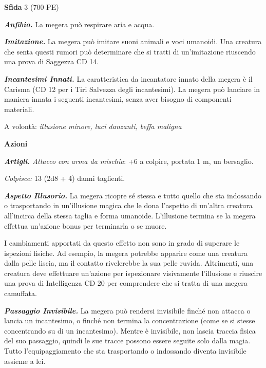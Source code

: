 \begin{multicols}{2}
\textbf{Sfida} 3 (700 PE)

\emph{\textbf{Anfibio.}} La megera può respirare aria e acqua.

\emph{\textbf{Imitazione.}} La megera può imitare suoni animali e voci umanoidi. Una creatura che senta questi rumori può determinare che si tratti di un'imitazione riuscendo una prova di Saggezza CD 14.

\emph{\textbf{Incantesimi Innati.}} La caratteristica da incantatore innato della megera è il Carisma (CD 12 per i Tiri Salvezza degli incantesimi). La megera può lanciare in maniera innata i seguenti incantesimi, senza aver bisogno di componenti materiali.

A volontà: \emph{illusione minore, luci danzanti, beffa maligna}

\textbf{Azioni}

\emph{\textbf{Artigli.} Attacco con arma da mischia}: +6 a colpire,
portata 1 m, un bersaglio.

\emph{Colpisce:} 13 (2d8 + 4) danni taglienti.

\emph{\textbf{Aspetto Illusorio.}} La megera ricopre sé stessa e tutto quello che sta indossando o trasportando in un'illusione magica che le dona l'aspetto di un'altra creatura all'incirca della stessa taglia e forma umanoide. L'illusione termina se la megera effettua un'azione bonus per terminarla o se muore.

I cambiamenti apportati da questo effetto non sono in grado di superare le ispezioni fisiche. Ad esempio, la megera potrebbe apparire come una creatura dalla pelle liscia, ma il contatto rivelerebbe la sua pelle ruvida. Altrimenti, una creatura deve effettuare un'azione per ispezionare visivamente l'illusione e riuscire una prova di Intelligenza CD 20 per comprendere che si tratta di una megera camuffata.

\emph{\textbf{Passaggio Invisibile.}} La megera può rendersi invisibile finché non attacca o lancia un incantesimo, o finché non termina la concentrazione (come se si stesse concentrando su di un incantesimo). Mentre è invisibile, non lascia traccia fisica del suo passaggio, quindi le sue tracce possono essere seguite solo dalla magia. Tutto l'equipaggiamento che sta trasportando o indossando diventa invisibile assieme a lei.


\end{multicols}
